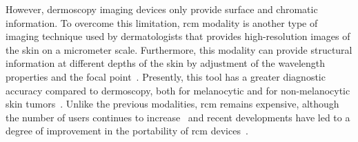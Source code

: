 \documentclass[journal,article,submit,moreauthors,pdftex, applsci]{Definitions/mdpi}
\begin{document}
However, dermoscopy imaging devices only provide surface and chromatic information. To overcome this limitation, \ac{rcm} modality is another type of imaging technique used by dermatologists that provides high-resolution images of the skin on a micrometer scale. Furthermore, this modality can provide structural information at different depths of the skin by adjustment of the wavelength properties and the focal point~\cite{Kolm2012}. Presently, this tool has a greater diagnostic accuracy compared to dermoscopy, both for melanocytic and for non-melanocytic skin tumors~\cite{Haroon2017, Dinnes2018, Lupu2019}. Unlike the previous modalities, \ac{rcm} remains expensive, although the number of users continues to increase~\cite{Batta2015} and recent developments have led to a degree of improvement in the portability of \ac{rcm} devices~\cite{Freeman2018}.\par
\end{document}
